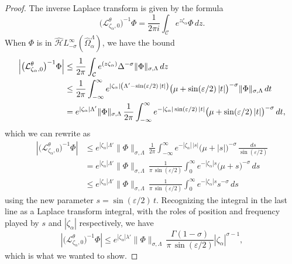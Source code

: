 \documentclass{article}
\let\Re\relax
\DeclareMathOperator{\Re}{Re}
\newcommand{\dualsingexp}[1]{\widehat{\mathcal{H}}L^\infty_{#1}}
\newcommand{\laplace}{\mathcal{L}}
\theoremstyle{definition}
\theoremstyle{plain}
\begin{document}
\begin{proof}

The inverse Laplace transform is given by the formula
\[ \big(\laplace_{\zeta_\alpha, 0}^\theta\big)^{-1} \Phi = \frac{1}{2 \pi i} \int_{\mathcal{C}} e^{z\zeta_\alpha} \Phi\,dz. \]
When $\Phi$ is in $\dualsingexp{-\sigma}(\widehat{\Omega}_\alpha^\Lambda)$, we have the bound
\begin{align*}
\left|\big(\laplace_{\zeta_\alpha, 0}^\theta\big)^{-1} \Phi\right| & \le \frac{1}{2 \pi} \int_{\mathcal{C}} e^{\Re(z\zeta_\alpha)} \Delta^{-\sigma} \|\Phi\|_{\sigma, \Lambda}\,dz \\
& \le \frac{1}{2 \pi} \int_{-\infty}^\infty e^{|\zeta_\alpha| \left(\Lambda' - \sin(\varepsilon/2)\,|t|\right)} \big(\mu + \sin(\varepsilon/2)\,|t|\big)^{-\sigma} \|\Phi\|_{\sigma, \Lambda}\,dt \\
& = e^{|\zeta_\alpha| \Lambda'} \|\Phi\|_{\sigma, \Lambda}\,\frac{1}{2 \pi} \int_{-\infty}^\infty e^{-|\zeta_\alpha| \sin(\varepsilon/2)\,|t|} \big(\mu + \sin(\varepsilon/2)\,|t|\big)^{-\sigma}\,dt,
\end{align*}
which we can rewrite as
\begin{align*}
\left|\big(\laplace_{\zeta_\alpha, 0}^\theta\big)^{-1} \Phi\right| & \le e^{|\zeta_\alpha| \Lambda'} \|\Phi\|_{\sigma, \Lambda}\,\frac{1}{2 \pi} \int_{-\infty}^\infty e^{-|\zeta_\alpha| \,|s|} \big(\mu + |s|\big)^{-\sigma}\,\frac{ds}{\sin(\varepsilon/2)} \\
& = e^{|\zeta_\alpha| \Lambda'} \|\Phi\|_{\sigma, \Lambda}\,\frac{1}{\pi\,\sin(\varepsilon/2)} \int_0^\infty e^{-|\zeta_\alpha|s} \big(\mu + s\big)^{-\sigma}\,ds \\
& \le e^{|\zeta_\alpha| \Lambda'} \|\Phi\|_{\sigma, \Lambda}\,\frac{1}{\pi\,\sin(\varepsilon/2)} \int_0^\infty e^{-|\zeta_\alpha|s} s^{-\sigma}\,ds
\end{align*}
using the new parameter $s = \sin(\varepsilon/2)\,t$. Recognizing the integral in the last line as a Laplace transform integral, with the roles of position and frequency played by $s$ and $|\zeta_\alpha|$ respectively, we have
\[ \left|\big(\laplace_{\zeta_\alpha, 0}^\theta\big)^{-1} \Phi\right| \le e^{|\zeta_\alpha| \lambda'} \|\Phi\|_{\sigma, \Lambda}\,\frac{\Gamma(1-\sigma)}{\pi\,\sin(\varepsilon/2)} |\zeta_\alpha|^{\sigma-1}, \]
which is what we wanted to show.
\end{proof}
%
\end{document}
